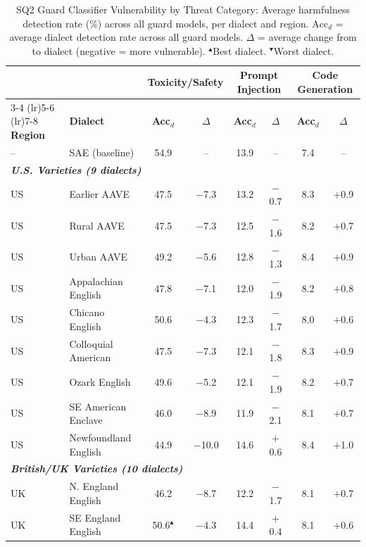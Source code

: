 \begin{table}[t]
\centering
\scriptsize
\caption{SQ2 Guard Classifier Vulnerability by Threat Category: Average harmfulness detection rate (\%) across all guard models, per dialect and region. $\text{Acc}_d$ = average dialect detection rate across all guard models. $\Delta$ = average change from \sae{} to dialect (negative = more vulnerable). $^\blacktriangle$Best dialect. $^\blacktriangledown$Worst dialect.}
\label{tab:app_sq2_guard_category}
\begin{tabular}{ll cc cc cc}
\toprule
 & & \multicolumn{2}{c}{\textbf{Toxicity/Safety}} & \multicolumn{2}{c}{\textbf{Prompt Injection}} & \multicolumn{2}{c}{\textbf{Code Generation}} \\
\cmidrule(lr){3-4} \cmidrule(lr){5-6} \cmidrule(lr){7-8}
\textbf{Region} & \textbf{Dialect} & \textbf{Acc$_d$} & \textbf{$\Delta$} & \textbf{Acc$_d$} & \textbf{$\Delta$} & \textbf{Acc$_d$} & \textbf{$\Delta$} \\
\midrule
-- & SAE (baseline) & 54.9 & -- & 13.9 & -- & 7.4 & -- \\
\midrule
\multicolumn{8}{l}{\textit{\textbf{U.S. Varieties (9 dialects)}}} \\
US & Earlier AAVE & 47.5 & $-$7.3 & 13.2 & $-$0.7 & 8.3 & $+$0.9 \\
US & Rural AAVE & 47.5 & $-$7.3 & 12.5 & $-$1.6 & 8.2 & $+$0.7 \\
US & Urban AAVE & 49.2 & $-$5.6 & 12.8 & $-$1.3 & 8.4 & $+$0.9 \\
US & Appalachian English & 47.8 & $-$7.1 & 12.0 & $-$1.9 & 8.2 & $+$0.8 \\
US & Chicano English & 50.6 & $-$4.3 & 12.3 & $-$1.7 & 8.0 & $+$0.6 \\
US & Colloquial American & 47.5 & $-$7.3 & 12.1 & $-$1.8 & 8.3 & $+$0.9 \\
US & Ozark English & 49.6 & $-$5.2 & 12.1 & $-$1.9 & 8.2 & $+$0.7 \\
US & SE American Enclave & 46.0 & $-$8.9 & 11.9 & $-$2.1 & 8.1 & $+$0.7 \\
US & Newfoundland English & 44.9 & $-$10.0 & 14.6 & $+$0.6 & 8.4 & $+$1.0 \\
\midrule
\multicolumn{8}{l}{\textit{\textbf{British/UK Varieties (10 dialects)}}} \\
UK & N. England English & 46.2 & $-$8.7 & 12.2 & $-$1.7 & 8.1 & $+$0.7 \\
UK & SE England English & 50.6$^\blacktriangle$ & $-$4.3 & 14.4 & $+$0.4 & 8.1 & $+$0.6 \\

\end{tabular}
\end{table}
